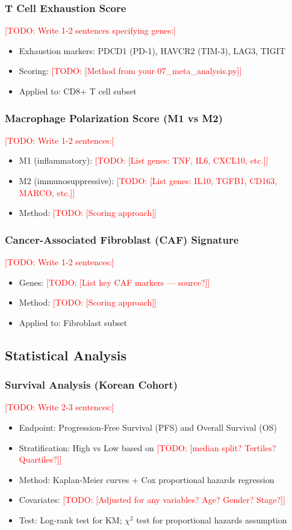 \documentclass[12pt,oneside]{article}
\newcommand{\TODO}[1]{\textcolor{red}{[TODO: #1]}}
\begin{document}
\subsubsection{T Cell Exhaustion Score}
\TODO{Write 1-2 sentences specifying genes:}
\begin{itemize}
    \item Exhaustion markers: PDCD1 (PD-1), HAVCR2 (TIM-3), LAG3, TIGIT
    \item Scoring: \TODO{[Method from your 07_meta_analysis.py]}
    \item Applied to: CD8+ T cell subset
\end{itemize}

\subsubsection{Macrophage Polarization Score (M1 vs M2)}
\TODO{Write 1-2 sentences:}
\begin{itemize}
    \item M1 (inflammatory): \TODO{[List genes: TNF, IL6, CXCL10, etc.]}
    \item M2 (immunosuppressive): \TODO{[List genes: IL10, TGFB1, CD163, MARCO, etc.]}
    \item Method: \TODO{[Scoring approach]}
\end{itemize}

\subsubsection{Cancer-Associated Fibroblast (CAF) Signature}
\TODO{Write 1-2 sentences:}
\begin{itemize}
    \item Genes: \TODO{[List key CAF markers — source?]}
    \item Method: \TODO{[Scoring approach]}
    \item Applied to: Fibroblast subset
\end{itemize}

\subsection{Statistical Analysis}

\subsubsection{Survival Analysis (Korean Cohort)}
\TODO{Write 2-3 sentences:}
\begin{itemize}
    \item Endpoint: Progression-Free Survival (PFS) and Overall Survival (OS)
    \item Stratification: High vs Low based on \TODO{[median split? Tertiles? Quartiles?]}
    \item Method: Kaplan-Meier curves + Cox proportional hazards regression
    \item Covariates: \TODO{[Adjusted for any variables? Age? Gender? Stage?]}
    \item Test: Log-rank test for KM; $\chi^2$ test for proportional hazards assumption
\end{itemize}
\end{document}
